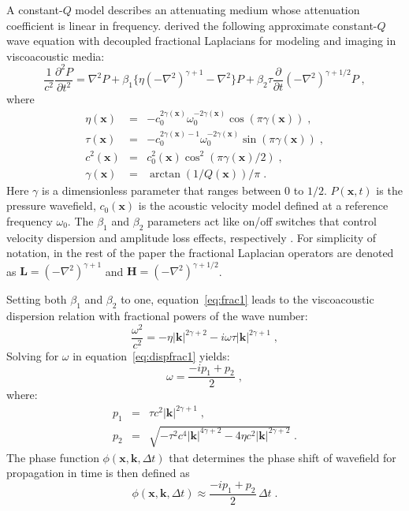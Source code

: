 A constant-$Q$ model \cite[]{kja79} describes an attenuating medium whose  attenuation coefficient is linear in frequency. \cite{zhu14a} derived the following approximate constant-$Q$ wave equation with decoupled fractional Laplacians for modeling and imaging in viscoacoustic media:
\begin{equation}
  \label{eq:frac1}
 \frac{1}{c^2}\frac{\partial^2 P}{\partial t^2} = \nabla^2 P + \beta_1 \{ \eta (-\nabla^2)^{\gamma+1} - \nabla^2 \} P 
 + \beta_2 \tau \frac{\partial}{\partial t}(-\nabla^2)^{\gamma+1/2} P \;, 
\end{equation}
where
\begin{eqnarray}
\eta(\mathbf{x}) &=& -c_0^{2\gamma(\mathbf{x})}\omega_0^{-2\gamma(\mathbf{x})}\cos(\pi \gamma(\mathbf{x})) \;, \\ 
\tau(\mathbf{x}) &=& -c_0^{2\gamma(\mathbf{x})-1}\omega_0^{-2\gamma(\mathbf{x})}\sin(\pi \gamma(\mathbf{x})) \;, \\
c^2(\mathbf{x}) &=& c_0^2(\mathbf{x})\cos^2(\pi\gamma(\mathbf{x})/2) \;, \\
\gamma(\mathbf{x}) &=& \arctan(1/Q(\mathbf{x}))/\pi \;.
\end{eqnarray}
Here $\gamma$ is a dimensionless parameter that ranges between $0$ to $1/2$. $P(\mathbf{x},t)$ is the pressure wavefield, $c_0(\mathbf{x})$ is the acoustic velocity model defined at a reference frequency $\omega_0$. The $\beta_1$ and $\beta_2$ parameters act like on/off switches that control velocity dispersion and amplitude loss effects, respectively \cite[]{zhu14a}. For simplicity of notation, in the rest  of the paper the fractional Laplacian operators are denoted as $\mathbf{L} = (-\nabla^2)^{\gamma+1}$ and $\mathbf{H} = (-\nabla^2)^{\gamma+1/2}$.

Setting both $\beta_1$ and $\beta_2$ to one, equation~\ref{eq:frac1} leads to the viscoacoustic dispersion relation with fractional powers of the wave number:
\begin{equation}
    {\frac{\omega^2}{c^2}} = {-\eta |\mathbf{k}|^{2\gamma +2} - i \omega\tau |\mathbf{k}|^{2\gamma +1}} \;, 
   \label{eq:dispfrac1}
\end{equation}
Solving for $\omega$ in equation~\ref{eq:dispfrac1} yields:
\begin{equation}
  \label{eq:omega}
  \omega = \frac{-ip_1 + p_2}{2} \; ,
\end{equation}
where:
\begin{eqnarray}
  \label{eq:p1}
  p_1 &=& \tau c^2|\mathbf{k}|^{2\gamma+1} \; , \\
  \label{eq:p2}
  p_2 &=& \sqrt{-\tau^2c^4|\mathbf{k}|^{4\gamma+2}-4\eta c^2|\mathbf{k}|^{2\gamma+2}} \;.
\end{eqnarray}
The phase function $\phi (\mathbf{x},\mathbf{k},\Delta t)$ that determines the phase shift of  wavefield for propagation in time is then defined as
\begin{equation}
  \label{eq:phasefunc}
  \phi (\mathbf{x},\mathbf{k},\Delta t) \approx \frac{-ip_1 + p_2}{2}\,\Delta t \; .
\end{equation}

